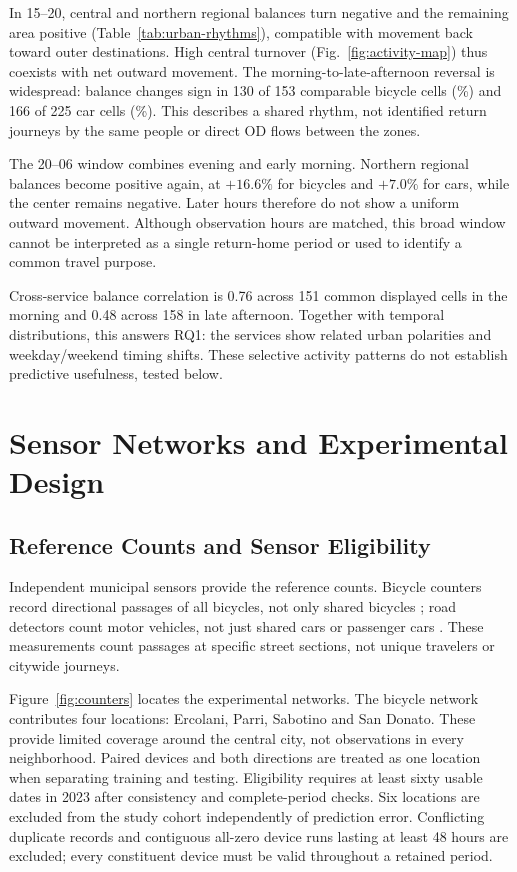 \documentclass[]{interact}
\begin{document}
In 15--20, central and northern regional balances turn negative and the remaining area positive (Table~\ref{tab:urban-rhythms}), compatible with movement back toward outer destinations. High central turnover (Fig.~\ref{fig:activity-map}) thus coexists with net outward movement. The morning-to-late-afternoon reversal is widespread: balance changes sign in 130 of 153 comparable bicycle cells (\BikeReversal\%) and 166 of 225 car cells (\CarReversal\%). This describes a shared rhythm, not identified return journeys by the same people or direct OD flows between the zones.

The 20--06 window combines evening and early morning. Northern regional balances become positive again, at $+16.6\%$ for bicycles and $+7.0\%$ for cars, while the center remains negative. Later hours therefore do not show a uniform outward movement. Although observation hours are matched, this broad window cannot be interpreted as a single return-home period or used to identify a common travel purpose.

Cross-service balance correlation is 0.76 across 151 common displayed cells in the morning and 0.48 across 158 in late afternoon. Together with temporal distributions, this answers RQ1: the services show related urban polarities and weekday/weekend timing shifts. These selective activity patterns do not establish predictive usefulness, tested below.

\section{Sensor Networks and Experimental Design}
\label{sec:design}
\subsection{Reference Counts and Sensor Eligibility}
Independent municipal sensors provide the reference counts. Bicycle counters record directional passages of all bicycles, not only shared bicycles \citep{bolognaCounters}; road detectors count motor vehicles, not just shared cars or passenger cars \citep{bolognaLoops}. These measurements count passages at specific street sections, not unique travelers or citywide journeys.

Figure~\ref{fig:counters} locates the experimental networks. The bicycle network contributes four locations: Ercolani, Parri, Sabotino and San Donato. These provide limited coverage around the central city, not observations in every neighborhood. Paired devices and both directions are treated as one location when separating training and testing. Eligibility requires at least sixty usable dates in 2023 after consistency and complete-period checks. Six locations are excluded from the study cohort independently of prediction error. Conflicting duplicate records and contiguous all-zero device runs lasting at least 48 hours are excluded; every constituent device must be valid throughout a retained period.
\end{document}

